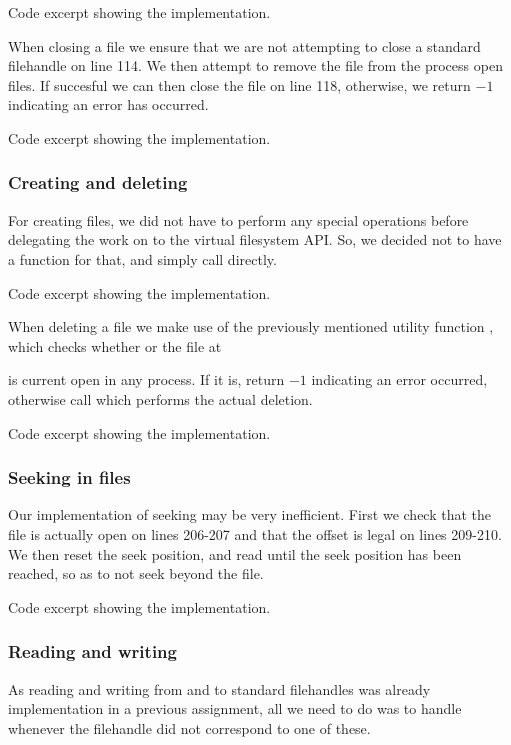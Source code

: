 {Code excerpt showing the  implementation.}

\newpage
When closing a file we ensure that we are not attempting to close a standard
filehandle  on line 114. We then attempt to remove
the file from the process open files. If succesful we can then close the file
on line 118, otherwise, we return $-1$ indicating an error has occurred.

{Code excerpt showing the  implementation.}

\subsubsection{Creating and deleting}
For creating files, we did not have to perform any special operations before
delegating the work on to the virtual filesystem API. So, we decided not to
have a function for that, and simply call  directly.

{Code excerpt showing the  implementation.}

When deleting a file we make use of the previously mentioned utility function
, which checks whether or the file at

 is current open in any process. If it is, return $-1$
indicating an error occurred, otherwise call  which performs
the actual deletion.

{Code excerpt showing the  implementation.}

\newpage
\subsubsection{Seeking in files}
Our implementation of seeking may be very inefficient. First we check that the
file is actually open on lines 206-207 and that the offset is legal on lines
209-210. We then reset the seek position, and read until the seek position has
been reached, so as to not seek beyond the file.

{Code excerpt showing the  implementation.}

\subsubsection{Reading and writing}
As reading and writing from and to standard filehandles
 was already implementation in a previous assignment,
all we need to do was to handle whenever the filehandle did not correspond to
one of these.

